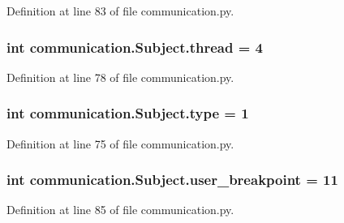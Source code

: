 Definition at line 83 of file communication.\+py.

\hypertarget{classcommunication_1_1Subject_a1528e4403b2d635be7f0b75996ef9eeb}{}
\subsubsection[{thread}]{\setlength{\rightskip}{0pt plus 5cm}int communication.\+Subject.\+thread = 4\hspace{0.3cm}{\ttfamily [static]}}\label{classcommunication_1_1Subject_a1528e4403b2d635be7f0b75996ef9eeb}


Definition at line 78 of file communication.\+py.

\hypertarget{classcommunication_1_1Subject_a2b0a19b587eedf252e060644e25335ad}{}
\subsubsection[{type}]{\setlength{\rightskip}{0pt plus 5cm}int communication.\+Subject.\+type = 1\hspace{0.3cm}{\ttfamily [static]}}\label{classcommunication_1_1Subject_a2b0a19b587eedf252e060644e25335ad}


Definition at line 75 of file communication.\+py.

\hypertarget{classcommunication_1_1Subject_aabef6ff24a331e2af1ba5c937f137f1d}{}
\subsubsection[{user\+\_\+breakpoint}]{\setlength{\rightskip}{0pt plus 5cm}int communication.\+Subject.\+user\+\_\+breakpoint = 11\hspace{0.3cm}{\ttfamily [static]}}\label{classcommunication_1_1Subject_aabef6ff24a331e2af1ba5c937f137f1d}


Definition at line 85 of file communication.\+py.

\hypertarget{classcommunication_1_1Subject_a73c6626ee68ebdc7f9eacd1065d499e6}{}
